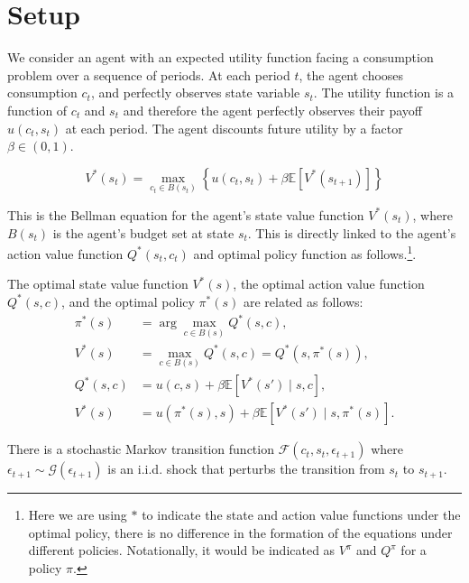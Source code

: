 
\section{Setup} \label{sec:setup}

We consider an agent with an expected utility function facing a consumption problem
over a sequence of periods. At each period $t$, the agent chooses consumption $c_t$,
and perfectly observes state variable $s_t$. The utility function is a function of
$c_t$ and $s_t$ and therefore the agent perfectly observes their payoff $u(c_t, s_t)$ at
each period. The agent discounts future utility by a factor $\beta \in (0,1)$.

\begin{equation}
    V^*(s_t) = \max_{c_t \in B(s_t)} \left\{ u(c_t, s_t) + \beta \mathbb{E} \left[ V^*(s_{t+1}) \right] \right\}
\end{equation}

This is the Bellman equation for the agent's state value function $V^*(s_t)$, where
$B(s_t)$ is the agent's budget set at state $s_t$. This is directly linked to the
agent's action value function $Q^*(s_t, c_t)$ and optimal policy function as follows.\footnote{Here we are using 
$*$ to indicate the state and action value functions under the optimal policy,
there is no difference in the formation of the equations under different policies. 
Notationally, it would be indicated as $V^\pi$ and $Q^\pi$ for a policy $\pi$.}.

\begin{proposition} \label{prop:bellman_relationships}
The optimal state value function $V^*(s)$, the optimal action value function $Q^*(s, c)$, and the optimal policy $\pi^*(s)$ are related as follows:
\begin{align*}
    \pi^*(s) &= \arg\max_{c \in B(s)} Q^*(s, c), \\
    V^*(s) &= \max_{c \in B(s)} Q^*(s, c) = Q^*(s, \pi^*(s)), \\
    Q^*(s, c) &= u(c, s) + \beta \mathbb{E}[V^*(s') \mid s, c], \\
    V^*(s) &= u(\pi^*(s), s) + \beta \mathbb{E}[V^*(s') \mid s, \pi^*(s)].
\end{align*}
\end{proposition}

There is a stochastic Markov transition function $\mathcal{F}(c_t, s_t, \epsilon_{t+1})$
where $\epsilon_{t+1} \sim \mathcal{G}(\epsilon_{t+1})$ is an i.i.d. shock that perturbs
the transition from $s_t$ to $s_{t+1}$.

